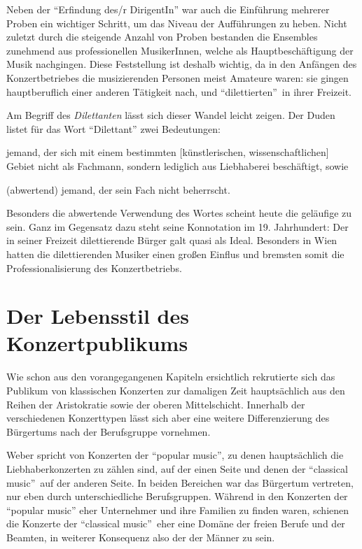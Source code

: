 \documentclass[a4paper, german, oneside]{scrbook}
\begin{document}
Neben der \enquote{Erfindung des/r DirigentIn} war auch die Einführung mehrerer Proben ein wichtiger Schritt, um das Niveau der Aufführungen zu heben. Nicht zuletzt durch die steigende Anzahl von Proben bestanden die Ensembles zunehmend aus professionellen MusikerInnen, welche als Hauptbeschäftigung der Musik nachgingen. Diese Feststellung ist deshalb wichtig, da in den Anfängen des Konzertbetriebes die musizierenden Personen meist Amateure waren: sie gingen hauptberuflich einer anderen Tätigkeit nach, und \enquote{dilettierten} in ihrer Freizeit.

Am Begriff des \emph{Dilettanten} lässt sich dieser Wandel leicht zeigen. Der Duden listet für das Wort \enquote{Dilettant} zwei Bedeutungen:
\begin{inparaenum}[(a)]
	\item jemand, der sich mit einem bestimmten [künstlerischen, wissenschaftlichen] Gebiet nicht als Fachmann, sondern lediglich aus Liebhaberei beschäftigt, sowie
	\item (abwertend) jemand, der sein Fach nicht beherrscht.
\end{inparaenum}
\parencite{Dilettant}

Besonders die abwertende Verwendung des Wortes scheint heute die geläufige zu sein. Ganz im Gegensatz dazu steht seine Konnotation im 19. Jahrhundert: Der in seiner Freizeit dilettierende Bürger galt quasi als Ideal. Besonders in Wien hatten die dilettierenden Musiker einen großen Einflus und bremsten somit die Professionalisierung des Konzertbetriebs. \parencite[vgl.][88]{weber_music_2004}



\section{Der Lebensstil des Konzertpublikums} %
\label{lebensstil}
Wie schon aus den vorangegangenen Kapiteln ersichtlich rekrutierte sich das Publikum von klassischen Konzerten zur damaligen Zeit hauptsächlich aus den Reihen der Aristokratie sowie der oberen Mittelschicht. Innerhalb der verschiedenen Konzerttypen lässt sich aber eine weitere Differenzierung des Bürgertums nach der Berufsgruppe vornehmen.

Weber spricht von Konzerten der \enquote{popular music}, zu denen hauptsächlich die Liebhaberkonzerten zu zählen sind, auf der einen Seite und denen der \enquote{classical music} auf der anderen Seite. In beiden Bereichen war das Bürgertum vertreten, nur eben durch unterschiedliche Berufsgruppen. Während in den Konzerten der \enquote{popular music} eher Unternehmer und ihre Familien zu finden waren, schienen die Konzerte der \enquote{classical music} eher eine Domäne der freien Berufe und der Beamten, in weiterer Konsequenz also der der Männer zu sein. \parencite[vgl.][S. 63 und 66]{weber_music_2004}
\end{document}
